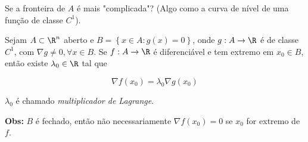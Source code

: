 \documentclass[11pt, oneside, a4paper]{gsm-l}
\begin{document}
\begin{sol}
\end{sol}

Se a fronteira de $A$ é mais "complicada"? (Algo como a curva de nível de uma função de classe $C^1$).

\begin{teo}
    Sejam $A \subset \R^n$ aberto e $B = \left\{ {x \in A:g\left( x \right) = 0} \right\}$, onde $g:A \to \R$ é de classe $C^1$, com $\nabla g \ne 0,\forall x \in B$. Se $f:A \to \R$ é diferenciável e tem extremo em $x_0  \in B$, então existe $\lambda_0 \in \R$ tal que

\[
\nabla f\left( {x_0 } \right) = \lambda _0 \nabla g\left( {x_0 } \right)
\]

$\lambda _0$ é chamado \textit{multiplicador de Lagrange}.

    \textbf{Obs:} $B$ é fechado, então não necessariamente $\nabla f\left( {x_0 } \right) = 0$ se $x_0$ for extremo de $f$.

\end{teo}
\end{document}
